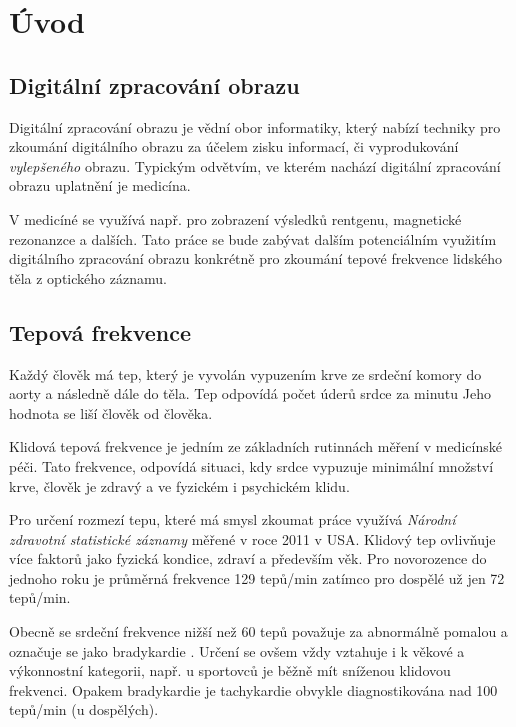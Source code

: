 \documentclass[
  digital, %
  table,   %
%
  lof,     %
  lot,     %
]{fithesis3}
\begin{document}
\chapter{Úvod}
\section{Digitální zpracování obrazu}
Digitální zpracování obrazu je vědní obor informatiky, který nabízí techniky pro zkoumání digitálního obrazu za účelem zisku informací, či vyprodukování \emph{vylepšeného} obrazu. Typickým odvětvím, ve kterém nachází digitální zpracování obrazu uplatnění je medicína.

V medicíné se využívá např. pro zobrazení výsledků rentgenu, magnetické rezonanzce a dalších. Tato práce se bude zabývat dalším potenciálním využitím digitálního zpracování obrazu konkrétně pro zkoumání tepové frekvence lidského těla z optického záznamu.

\section{Tepová frekvence}
Každý člověk má tep, který je vyvolán vypuzením krve ze srdeční komory do aorty a následně dále do těla. Tep odpovídá počet úderů srdce za minutu Jeho hodnota se liší člověk od člověka.

Klidová tepová frekvence je jedním ze základních rutinnách měření v medicínské péči. Tato frekvence, odpovídá situaci, kdy srdce vypuzuje minimální množství krve, člověk je zdravý a ve fyzickém i psychickém klidu.

Pro určení rozmezí tepu, které má smysl zkoumat práce využívá \emph{Národní zdravotní statistické záznamy}\cite{national-health-statistics-reports} měřené v roce 2011 v USA. Klidový tep ovlivňuje více faktorů jako fyzická kondice, zdraví a především věk. Pro novorozence do jednoho roku je průměrná frekvence 129 tepů/min zatímco pro dospělé už jen 72 tepů/min.

Obecně se srdeční frekvence nižší než 60 tepů považuje za abnormálně pomalou a označuje se jako bradykardie
\cite{http://www.heart.org/HEARTORG/Conditions/Arrhythmia/AboutArrhythmia/Bradycardia-Slow-Heart-Rate_UCM_302016_Article.jsp}.
Určení se ovšem vždy vztahuje i k věkové a výkonnostní kategorii, např. u sportovců je běžně mít sníženou klidovou frekvenci. Opakem bradykardie je tachykardie
\cite{http://www.heart.org/HEARTORG/Conditions/Arrhythmia/AboutArrhythmia/Tachycardia-Fast-Heart-Rate_UCM_302018_Article.jsp} obvykle diagnostikována nad 100 tepů/min (u dospělých).
\end{document}
